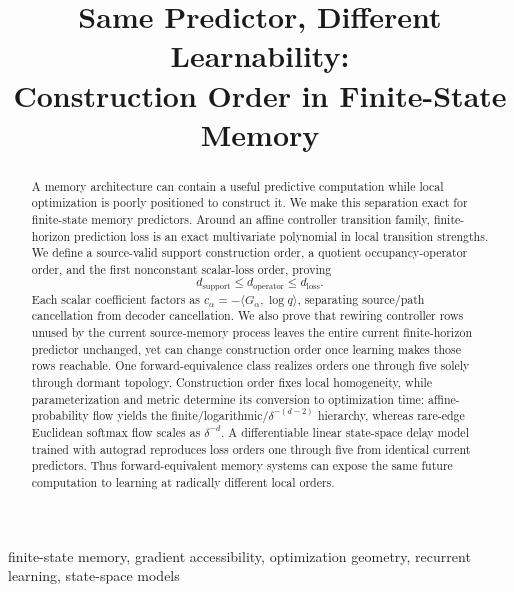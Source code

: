 \documentclass[twoside,11pt]{article}
\title{Same Predictor, Different Learnability:\\Construction Order in Finite-State Memory}
\newcommand{\dsupport}{d_{\mathrm{support}}}
\newcommand{\doperator}{d_{\mathrm{operator}}}
\newcommand{\dloss}{d_{\mathrm{loss}}}
\begin{document}
\maketitle

\begin{abstract}
A memory architecture can contain a useful predictive computation while local optimization is poorly positioned to construct it. We make this separation exact for finite-state memory predictors. Around an affine controller transition family, finite-horizon prediction loss is an exact multivariate polynomial in local transition strengths. We define a source-valid support construction order, a quotient occupancy-operator order, and the first nonconstant scalar-loss order, proving
\[
\dsupport\leq\doperator\leq\dloss.
\]
Each scalar coefficient factors as $c_\alpha=-\langle G_\alpha,\log q\rangle$, separating source/path cancellation from decoder cancellation. We also prove that rewiring controller rows unused by the current source-memory process leaves the entire current finite-horizon predictor unchanged, yet can change construction order once learning makes those rows reachable. One forward-equivalence class realizes orders one through five solely through dormant topology. Construction order fixes local homogeneity, while parameterization and metric determine its conversion to optimization time: affine-probability flow yields the finite/logarithmic/$\delta^{-(d-2)}$ hierarchy, whereas rare-edge Euclidean softmax flow scales as $\delta^{-d}$. A differentiable linear state-space delay model trained with autograd reproduces loss orders one through five from identical current predictors. Thus forward-equivalent memory systems can expose the same future computation to learning at radically different local orders.
\end{abstract}

\begin{keywords}
finite-state memory, gradient accessibility, optimization geometry, recurrent learning, state-space models
\end{keywords}












\FloatBarrier
{}

\appendix



\end{document}
